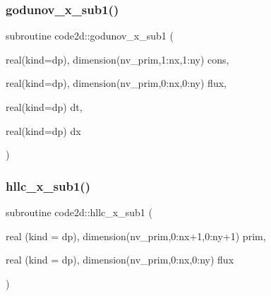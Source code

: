 \mbox{\label{mainSW_8f90_aec66a1d113ade1d60ad864482ea8e4cf}} 
\subsubsection{\texorpdfstring{godunov\+\_\+x\+\_\+sub1()}{godunov\_x\_sub1()}}
{\footnotesize\ttfamily subroutine code2d\+::godunov\+\_\+x\+\_\+sub1 (\begin{DoxyParamCaption}\item[{real(kind=dp), dimension(nv\+\_\+prim,1\+:nx,1\+:ny)}]{cons,  }\item[{real(kind=dp), dimension(nv\+\_\+prim,0\+:nx,0\+:ny)}]{flux,  }\item[{real(kind=dp)}]{dt,  }\item[{real(kind=dp)}]{dx }\end{DoxyParamCaption})}

\mbox{\label{mainSW_8f90_ad651365c868e762b033239f23065b179}} 
\subsubsection{\texorpdfstring{hllc\+\_\+x\+\_\+sub1()}{hllc\_x\_sub1()}}
{\footnotesize\ttfamily subroutine code2d\+::hllc\+\_\+x\+\_\+sub1 (\begin{DoxyParamCaption}\item[{real (kind = dp), dimension(nv\+\_\+prim,0\+:nx+1,0\+:ny+1)}]{prim,  }\item[{real (kind = dp), dimension(nv\+\_\+prim,0\+:nx,0\+:ny)}]{flux }\end{DoxyParamCaption})}

\mbox{\label{mainSW_8f90_a58ba3803323d27b63b474b0d71dd80cd}} 
